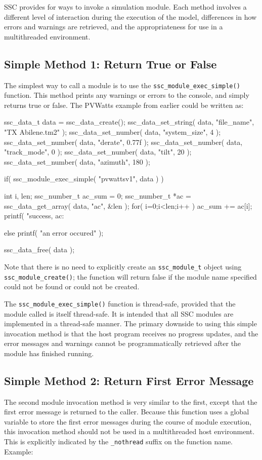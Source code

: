 \documentclass{article}
\begin{document}
SSC provides for ways to invoke a simulation module.  Each method involves a different level of interaction during the execution of the model, differences in how errors and warnings are retrieved, and the appropriateness for use in a multithreaded environment.

\subsection{Simple Method 1: Return True or False}

The simplest way to call a module is to use the \texttt{ssc\_module\_exec\_simple()} function.  This method prints any warnings or errors to the console, and simply returns true or false. The PVWatts example from earlier could be written as:

\begin{verbatimtab}[4]
ssc_data_t data = ssc_data_create();
ssc_data_set_string( data, "file_name", "TX Abilene.tm2" );
ssc_data_set_number( data, "system_size", 4 );
ssc_data_set_number( data, "derate", 0.77f );
ssc_data_set_number( data, "track_mode", 0 );
ssc_data_set_number( data, "tilt", 20 );
ssc_data_set_number( data, "azimuth", 180 );

if( ssc_module_exec_simple( "pvwattsv1", data ) )
{
	int i, len;
	ssc_number_t ac_sum = 0;
	ssc_number_t *ac = ssc_data_get_array( data, "ac", &len );
	for( i=0;i<len;i++ ) ac_sum += ac[i];
	printf( "success, ac: %

}
else
	printf( "an error occured\n" );

ssc_data_free( data );
\end{verbatimtab}

Note that there is no need to explicitly create an \texttt{ssc\_module\_t} object using \texttt{ssc\_module\_create()}; the function will return false if the module name specified could not be found or could not be created.

The \texttt{ssc\_module\_exec\_simple()} function is thread-safe, provided that the module called is itself thread-safe.  It is intended that all SSC modules are implemented in a thread-safe manner.  The primary downside to using this simple invocation method is that the host program receives no progress updates, and the error messages and warnings cannot be programmatically retrieved after the module has finished running.

\subsection{Simple Method 2: Return First Error Message}
The second module invocation method is very similar to the first, except that the first error message is returned to the caller.  Because this function uses a global variable to store the first error messages during the course of module execution, this invocation method should not be used in a multithreaded host environment.  This is explicitly indicated by the \texttt{\_nothread} suffix on the function name.  Example:
\end{document}
